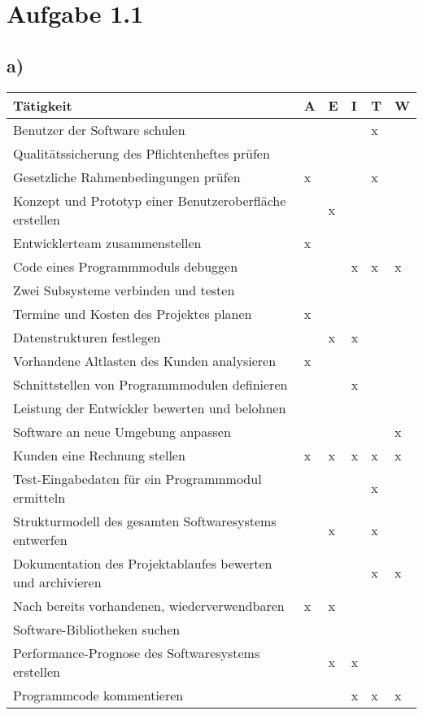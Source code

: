 \documentclass[a4paper,11pt]{scrartcl}
\begin{document}
		
	\section*{Aufgabe 1.1}
	\subsection*{a)}
	\begin{table}[h!]
		\begin{tabular}{l|l|l|l|l|l}
		 \textbf{Tätigkeit} 										&A &E &I &T &W \\ 
		 \hline
		 Benutzer der Software schulen								&  &  &  &x &  \\
		 Qualitätssicherung des Pflichtenheftes prüfen				&  &  &  &  &  \\
		 Gesetzliche Rahmenbedingungen prüfen						&x &  &  &x &  \\
		 Konzept und Prototyp einer Benutzeroberfläche erstellen	&  &x &  &  &  \\
		 Entwicklerteam zusammenstellen								&x &  &  &  &  \\
		 Code eines Programmmoduls debuggen							&  &  &x &x &x \\
 		 Zwei Subsysteme verbinden und testen						&  &  &  &  &  \\
 		 Termine und Kosten des Projektes planen					&x &  &  &  &  \\
		 Datenstrukturen festlegen									&  &x &x &  &  \\
		 Vorhandene Altlasten des Kunden analysieren				&x &  &  &  &  \\
		 Schnittstellen von Programmmodulen definieren				&  &  &x &  &  \\
		 Leistung der Entwickler bewerten und belohnen				&  &  &  &  &  \\
		 Software an neue Umgebung anpassen							&  &  &  &  &x \\
		 Kunden eine Rechnung stellen								&x &x &x &x &x \\
		 Test-Eingabedaten für ein Programmmodul ermitteln			&  &  &  &x &  \\ 
		 Strukturmodell des gesamten Softwaresystems entwerfen		&  &x &  &x &  \\ 
		 Dokumentation des Projektablaufes bewerten und archivieren	&  &  &  &x &x \\ 
		 Nach bereits vorhandenen, wiederverwendbaren 				&x &x &  &  &  \\ 
		 	Software-Bibliotheken suchen	&  &  &  &  &  \\ 	
		 Performance-Prognose des Softwaresystems erstellen			&  &x &x &  &  \\ 
		 Programmcode kommentieren									&  &  &x &x &x \\ 
		\end{tabular}
	\end{table}
\end{document}

